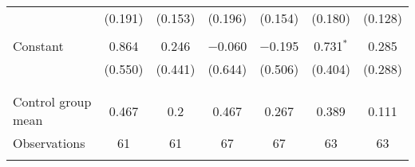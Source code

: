 \begin{tabular}{@{\extracolsep{5pt}}lcccccc}
  & (0.191) & (0.153) & (0.196) & (0.154) & (0.180) & (0.128) \\ 
  & & & & & & \\ 
 Constant & 0.864 & 0.246 & $-$0.060 & $-$0.195 & 0.731$^{*}$ & 0.285 \\ 
  & (0.550) & (0.441) & (0.644) & (0.506) & (0.404) & (0.288) \\ 
  & & & & & & \\ 
\hline \\[-1.8ex] 
Control group mean & 0.467 & 0.2 & 0.467 & 0.267 & 0.389 & 0.111 \\ 
Observations & 61 & 61 & 67 & 67 & 63 & 63 \\ 
\hline 
\hline \\[-1.8ex] 
\end{tabular} 
